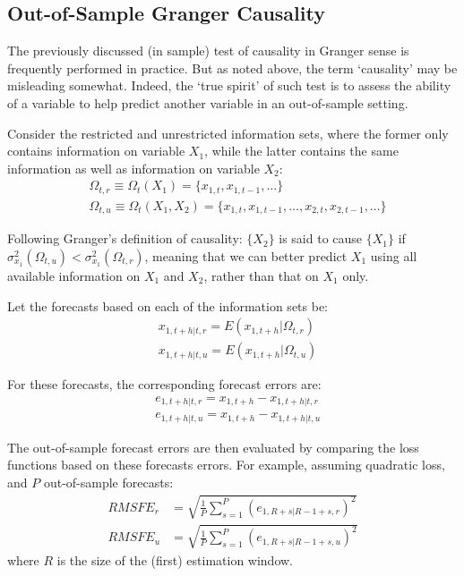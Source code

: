 \documentclass[
  oneside]{book}
\begin{document}
\hypertarget{out-of-sample-granger-causality}{%
\subsection{Out-of-Sample Granger Causality}\label{out-of-sample-granger-causality}}

The previously discussed (in sample) test of causality in Granger sense is frequently performed in practice. But as noted above, the term `causality' may be misleading somewhat. Indeed, the `true spirit' of such test is to assess the ability of a variable to help predict another variable in an out-of-sample setting.

Consider the restricted and unrestricted information sets, where the former only contains information on variable \(X_1\), while the latter contains the same information as well as information on variable \(X_2\):
\[\begin{aligned}
&\Omega_{t,r} \equiv \Omega_{t}(X_1) = \{x_{1,t},x_{1,t-1},\ldots\} \\
&\Omega_{t,u} \equiv \Omega_{t}(X_1,X_2) = \{x_{1,t},x_{1,t-1},\ldots,x_{2,t},x_{2,t-1},\ldots\}
\end{aligned}\]

Following Granger's definition of causality: \(\{X_2\}\) is said to cause \(\{X_1\}\) if \(\sigma_{x_1}^2\left(\Omega_{t,u}\right) < \sigma_{x_1}^2\left(\Omega_{t,r}\right)\), meaning that we can better predict \(X_1\) using all available information on \(X_1\) and \(X_2\), rather than that on \(X_1\) only.

Let the forecasts based on each of the information sets be:
\[\begin{aligned}
    &x_{1,t+h|t,r} = E\left(x_{1,t+h}|\Omega_{t,r}\right) \\
    &x_{1,t+h|t,u} = E\left(x_{1,t+h}|\Omega_{t,u}\right)
\end{aligned}\]

For these forecasts, the corresponding forecast errors are:
\[\begin{aligned}
    & e_{1,t+h|t,r} = x_{1,t+h} - x_{1,t+h|t,r}\\
    & e_{1,t+h|t,u} = x_{1,t+h} - x_{1,t+h|t,u}
\end{aligned}\]

The out-of-sample forecast errors are then evaluated by comparing the loss functions based on these forecasts errors. For example, assuming quadratic loss, and \(P\) out-of-sample forecasts:
\[\begin{aligned}
RMSFE_{r} &= \sqrt{\frac{1}{P}\sum_{s=1}^{P}\left(e_{1,R+s|R-1+s,r}\right)^2} \\
RMSFE_{u} &= \sqrt{\frac{1}{P}\sum_{s=1}^{P}\left(e_{1,R+s|R-1+s,u}\right)^2}
\end{aligned}\]
where \(R\) is the size of the (first) estimation window.
\end{document}
